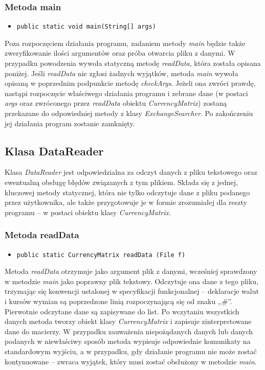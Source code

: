 \documentclass[a4paper,11pt]{article}
\newcommand\tab[1][0.6cm]{\hspace*{#1}}
\begin{document}
\subsubsection{Metoda main}

\begin{itemize}
\item \begin{lstlisting}
public static void main(String[] args)
\end{lstlisting}
\end{itemize}

\tab Poza rozpoczęciem działania programu, zadaniem metody \textit{main} będzie także zweryfikowanie ilości argumentów oraz próba otwarcia pliku z danymi. W przypadku powodzenia wywoła statyczną metodę \textit{readData}, która została opisana poniżej. Jeśli \textit{readData} nie zgłosi żadnych wyjątków, metoda \textit{main} wywoła opisaną w poprzednim podpunkcie metodę \textit{checkArgs}. Jeżeli ona zwróci prawdę, nastąpi rozpoczęcie właściwego działania programu i zebrane dane (w postaci \textit{args} oraz zwróconego przez \textit{readData} obiektu \textit{CurrencyMatrix}) zostaną przekazane do odpowiedniej metody z klasy \textit{ExchangeSearcher}. Po zakończeniu jej działania program zostanie zamknięty.

\subsection{Klasa DataReader}

\tab Klasa \textit{DataReader} jest odpowiedzialna za odczyt danych z pliku tekstowego oraz ewentualną obsługę błędów związanych z tym plikiem. Składa się z jednej, kluczowej metody statycznej, która nie tylko odczytuje dane z pliku podanego przez użytkownika, ale także przygotowuje je w formie zrozumiałej dla reszty programu -- w postaci obiektu klasy \textit{CurrencyMatrix}.

\subsubsection{Metoda readData}
\begin{itemize}
\item \begin{lstlisting}
public static CurrencyMatrix readData (File f)
\end{lstlisting}
\end{itemize}

\tab Metoda \textit{readData} otrzymuje jako argument plik  z danymi, wcześniej sprawdzony w metodzie \textit{main} jako poprawny plik tekstowy. Odczytuje ona dane z tego pliku, trzymając się konwencji ustalonej w specyfikacji funkcjonalnej -- deklaracje walut i kursów wymian są poprzedzone linią rozpoczynającą się od znaku ,,\#''. Pierwotnie odczytane dane są zapisywane do list. Po wczytaniu wszystkich danych metoda tworzy obiekt klasy \textit{CurrencyMatrix} i zapisuje zinterpretowane dane do macierzy. W przypadku zauważenia niepożądanych danych lub danych podanych w niewłaściwy sposób metoda wypisuje odpowiednie komunikaty na standardowym wyjściu, a w przypadku, gdy działanie programu nie może zostać kontynuowane -- zwraca wyjątek, który musi zostać obsłużony w metodzie \textit{main}.
\end{document}
